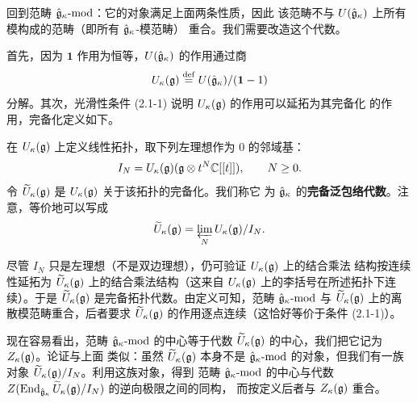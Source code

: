 回到范畴 $\hat{\mathfrak{g}}_\kappa\text{-}\mathrm{mod}$：它的对象满足上面两条性质，因此
该范畴不与 $U(\hat{\mathfrak{g}}_\kappa)$ 上所有模构成的范畴（即所有 $\hat{\mathfrak{g}}_\kappa$-模范畴）
重合。我们需要改造这个代数。

首先，因为 $\mathbf{1}$ 作用为恒等，$U(\hat{\mathfrak{g}}_\kappa)$ 的作用通过商
\[
    U_\kappa(\mathfrak{g})\overset{\mathrm{def}}{=}U(\hat{\mathfrak{g}}_\kappa)/(\mathbf{1}-1)
\]
分解。其次，光滑性条件 (2.1-1) 说明 $U_\kappa(\mathfrak{g})$ 的作用可以延拓为其完备化
的作用，完备化定义如下。

在 $U_\kappa(\mathfrak{g})$ 上定义线性拓扑，取下列左理想作为 $0$ 的邻域基：
\[
    I_N=U_\kappa(\mathfrak{g})(\mathfrak{g}\otimes t^N\mathbb{C}[[t]]),\qquad N\ge0.
\]
令 $\widetilde U_\kappa(\mathfrak{g})$ 是 $U_\kappa(\mathfrak{g})$ 关于该拓扑的完备化。我们称它
为 $\hat{\mathfrak{g}}_\kappa$ 的\textbf{完备泛包络代数}。注意，等价地可以写成
\[
    \widetilde U_\kappa(\mathfrak{g})=\varprojlim_N U_\kappa(\mathfrak{g})/I_N.
\]

尽管 $I_N$ 只是左理想（不是双边理想），仍可验证 $U_\kappa(\mathfrak{g})$ 上的结合乘法
结构按连续性延拓为 $\widetilde U_\kappa(\mathfrak{g})$ 上的结合乘法结构（这来自
$U_\kappa(\mathfrak{g})$ 上的李括号在所述拓扑下连续）。于是 $\widetilde U_\kappa(\mathfrak{g})$
是完备拓扑代数。由定义可知，范畴 $\hat{\mathfrak{g}}_\kappa\text{-}\mathrm{mod}$ 与
$\widetilde U_\kappa(\mathfrak{g})$ 上的离散模范畴重合，后者要求
$\widetilde U_\kappa(\mathfrak{g})$ 的作用逐点连续（这恰好等价于条件 (2.1-1)）。

现在容易看出，范畴 $\hat{\mathfrak{g}}_\kappa\text{-}\mathrm{mod}$ 的中心等于代数
$\widetilde U_\kappa(\mathfrak{g})$ 的中心，我们把它记为 $Z_\kappa(\mathfrak{g})$。论证与上面
类似：虽然 $\widetilde U_\kappa(\mathfrak{g})$ 本身不是 $\hat{\mathfrak{g}}_\kappa\text{-}\mathrm{mod}$
的对象，但我们有一族对象 $\widetilde U_\kappa(\mathfrak{g})/I_N$。利用这族对象，得到
范畴 $\hat{\mathfrak{g}}_\kappa\text{-}\mathrm{mod}$ 的中心与代数
$Z(\operatorname{End}_{\hat{\mathfrak{g}}_\kappa}\widetilde U_\kappa(\mathfrak{g})/I_N)$ 的逆向极限之间的同构，
而按定义后者与 $Z_\kappa(\mathfrak{g})$ 重合。

